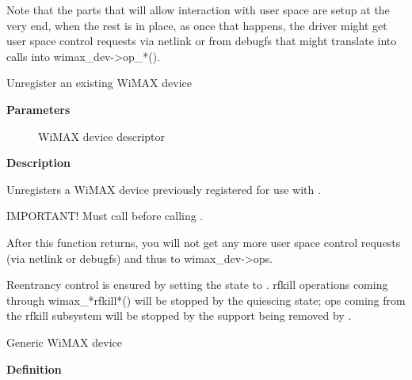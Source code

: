 \documentclass[a4paper,8pt,english]{sphinxmanual}
\begin{document}
Note that the parts that will allow interaction with user space are
setup at the very end, when the rest is in place, as once that
happens, the driver might get user space control requests via
netlink or from debugfs that might translate into calls into
wimax\_dev-\textgreater{}op\_*().

\begin{fulllineitems}
\label{networking/kapi:c.wimax_dev_rm}
Unregister an existing WiMAX device

\end{fulllineitems}


\textbf{Parameters}
\begin{description}
\item[{}] \leavevmode
WiMAX device descriptor

\end{description}

\textbf{Description}

Unregisters a WiMAX device previously registered for use with
.

IMPORTANT! Must call before calling {\hyperref[networking/kapi:c.unregister_netdev]{\emph{}}}.

After this function returns, you will not get any more user space
control requests (via netlink or debugfs) and thus to wimax\_dev-\textgreater{}ops.

Reentrancy control is ensured by setting the state to
. rfkill operations coming through
wimax\_*rfkill*() will be stopped by the quiescing state; ops coming
from the rfkill subsystem will be stopped by the support being
removed by .

\begin{fulllineitems}
\label{networking/kapi:c.wimax_dev}
Generic WiMAX device

\end{fulllineitems}


\textbf{Definition}
\end{document}
